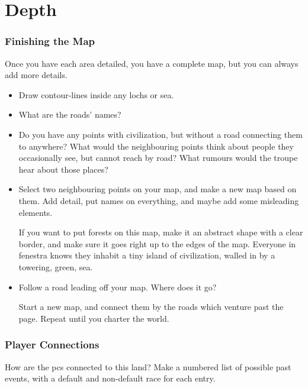 \foragingChart

\section{Depth}
\label{mapDepth}

\begin{multicols}{2}

\subsubsection{Finishing the Map}

\noindent
Once you have each area detailed, you have a complete map, but you can always add more details.

\begin{itemize}
  \item
  Draw contour-lines inside any lochs or sea.
  \item
  What are the roads' names?
  \item
  Do you have any points with civilization, but without a road connecting them to anywhere?
  What would the neighbouring points think about people they occasionally see, but cannot reach by road?
  What rumours would the troupe hear about those places?
  \item
  Select two neighbouring points on your map, and make a new map based on them.
  Add detail, put names on everything, and maybe add some misleading elements.

  If you want to put forests on this map, make it an abstract shape with a clear border, and make sure it goes right up to the edges of the map.
  Everyone in \gls{fenestra} knows they inhabit a tiny island of civilization, walled in by a towering, green, sea.
  \item
  Follow a road leading off your map.
  Where does it go?

  Start a new map, and connect them by the roads which venture past the page.
  Repeat until you charter the world.
\end{itemize}

\bigLine

\subsubsection{Player Connections}

How are the \glspl{pc} connected to this land?
Make a numbered list of possible past events, with a default and non-default race for each entry.


\end{multicols}
